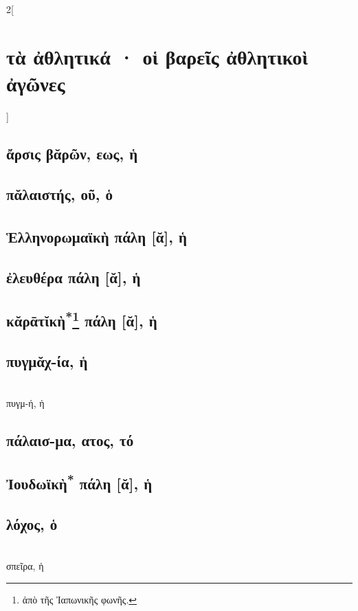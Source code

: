 \documentclass{book}
\begin{document}
\begin{multicols}{2}[\section{τὰ ἀθλητικά · οἱ βαρεῖς ἀθλητικοὶ ἀγῶνες}] %
{\renewcommand \thesubsection {\thesection} }
\subsection{ἄρσις βᾰρῶν, εως, ἡ}
\subsection{πᾰλαιστής, οῦ, ὁ}
\subsection{Ἑλληνορωμαϊκὴ\textsuperscript{\textdagger} πάλη [ᾰ], ἡ}
\subsection{ἐλευθέρα πάλη [ᾰ], ἡ}
\subsection{κᾰρᾱτῐκὴ\textsuperscript{*}\protect\footnote{ἀπὸ τῆς Ἰαπωνικῆς φωνῆς.} πάλη [ᾰ], ἡ}
\subsection{πυγμᾰχ-ία, ἡ}
 ~\\
πυγμ-ή, ἡ 
\subsection{πάλαισ-μα, ατος, τό}
\subsection{Ἰουδωϊκὴ\textsuperscript{*\number\value{footnote}} πάλη [ᾰ], ἡ} 
\subsection{λόχος, ὁ}
 ~\\
σπεῖρα, ἡ
~
\end{multicols}
\end{document}
